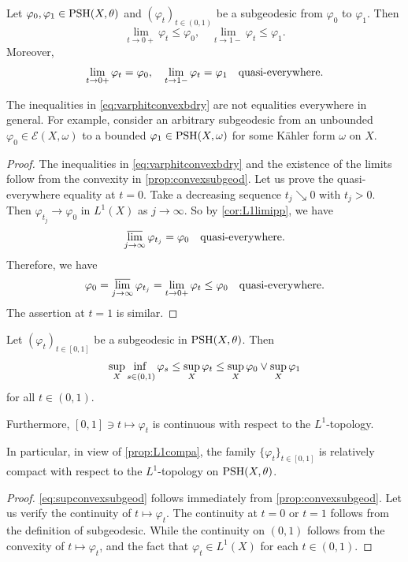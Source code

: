 \begin{corollary}\label{cor:subgeodboundary}
    Let $\varphi_0,\varphi_1\in \mathrm{PSH}(X,\theta)$ and $(\varphi_t)_{t\in (0,1)}$ be a subgeodesic from $\varphi_0$ to $\varphi_1$. Then
    \begin{equation}\label{eq:varphitconvexbdry}
    \lim_{t\to 0+}\varphi_t\leq \varphi_0,\quad   \lim_{t\to 1-}\varphi_t\leq \varphi_1.
    \end{equation}
    Moreover,
    \[
    \lim_{t\to 0+}\varphi_t=\varphi_0,\quad   \lim_{t\to 1-}\varphi_t=\varphi_1\quad \textup{quasi-everywhere}.
    \]
\end{corollary}
The inequalities in \eqref{eq:varphitconvexbdry} are not equalities everywhere in general. For example, consider an arbitrary subgeodesic from an unbounded $\varphi_0\in \mathcal{E}(X,\omega)$ to a bounded $\varphi_1\in \mathrm{PSH}(X,\omega)$ for some Kähler form $\omega$ on $X$.
\begin{proof}
    The inequalities in \eqref{eq:varphitconvexbdry} and the existence of the limits follow from the convexity in \cref{prop:convexsubgeod}. Let us prove the quasi-everywhere equality at $t=0$. Take a decreasing sequence $t_j\searrow 0$ with $t_j>0$. Then $\varphi_{t_j}\to \varphi_0$ in $L^1(X)$ as $j\to\infty$. So by \cref{cor:L1limipp}, we have
    \[
    \varlimsup_{j\to\infty}\varphi_{t_j}= \varphi_0\quad \textup{quasi-everywhere}.
    \]
    Therefore, we have
    \[
    \varphi_0=\varlimsup_{j\to\infty}\varphi_{t_j}=\lim_{t\to 0+}\varphi_t\leq \varphi_0\quad \textup{quasi-everywhere}.
    \]
    The assertion at $t=1$ is similar.
\end{proof}


\begin{corollary}\label{cor:convexsubgeod}
    Let $(\varphi_t)_{t\in [0,1]}$ be a subgeodesic in $\mathrm{PSH}(X,\theta)$. Then
    \begin{equation}\label{eq:supconvexsubgeod}
        \adjustlimits\sup_X \inf_{s\in (0,1)}\varphi_s \leq \sup_X \varphi_t\leq \sup_X \varphi_0\lor \sup_X \varphi_1
    \end{equation}
    for all $t\in (0,1)$.

    Furthermore, $[0,1] \ni t\mapsto \varphi_t$ is continuous with respect to the $L^1$-topology.
\end{corollary}
In particular, in view of \cref{prop:L1compa}, the family $\{\varphi_t\}_{t\in [0,1]}$ is relatively compact with respect to the $L^1$-topology on $\mathrm{PSH}(X,\theta)$.
\begin{proof}
    \eqref{eq:supconvexsubgeod} follows immediately from \cref{prop:convexsubgeod}.
    Let us verify the continuity of $t\mapsto \varphi_t$. The continuity at $t=0$ or $t=1$ follows from the definition of subgeodesic. While the continuity on $(0,1)$ follows from the convexity of $t\mapsto \varphi_t$, and the fact that $\varphi_t\in L^1(X)$ for each $t\in (0,1)$.
\end{proof}


